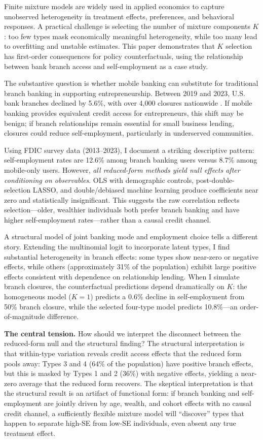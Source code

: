 \documentclass[12pt]{article}
\begin{document}
Finite mixture models are widely used in applied economics to capture unobserved heterogeneity in treatment effects, preferences, and behavioral responses. A practical challenge is selecting the number of mixture components $K$: too few types mask economically meaningful heterogeneity, while too many lead to overfitting and unstable estimates. This paper demonstrates that $K$ selection has first-order consequences for policy counterfactuals, using the relationship between bank branch access and self-employment as a case study.

The substantive question is whether mobile banking can substitute for traditional branch banking in supporting entrepreneurship. Between 2019 and 2023, U.S. bank branches declined by 5.6\%, with over 4,000 closures nationwide \citep{fdic2023}. If mobile banking provides equivalent credit access for entrepreneurs, this shift may be benign; if branch relationships remain essential for small business lending, closures could reduce self-employment, particularly in underserved communities.

Using FDIC survey data (2013--2023), I document a striking descriptive pattern: self-employment rates are 12.6\% among branch banking users versus 8.7\% among mobile-only users. However, \textit{all reduced-form methods yield null effects after conditioning on observables}. OLS with demographic controls, post-double-selection LASSO, and double/debiased machine learning produce coefficients near zero and statistically insignificant. This suggests the raw correlation reflects selection---older, wealthier individuals both prefer branch banking and have higher self-employment rates---rather than a causal credit channel.

A structural model of joint banking mode and employment choice tells a different story. Extending the multinomial logit to incorporate latent types, I find substantial heterogeneity in branch effects: some types show near-zero or negative effects, while others (approximately 31\% of the population) exhibit large positive effects consistent with dependence on relationship lending. When I simulate branch closures, the counterfactual predictions depend dramatically on $K$: the homogeneous model ($K=1$) predicts a 0.6\% decline in self-employment from 50\% branch closure, while the selected four-type model predicts 10.8\%---an order-of-magnitude difference.

\textbf{The central tension.} How should we interpret the disconnect between the reduced-form null and the structural finding? The structural interpretation is that within-type variation reveals credit access effects that the reduced form pools away: Types 3 and 4 (64\% of the population) have positive branch effects, but this is masked by Types 1 and 2 (36\%) with negative effects, yielding a near-zero average that the reduced form recovers. The skeptical interpretation is that the structural result is an artifact of functional form: if branch banking and self-employment are jointly driven by age, wealth, and cohort effects with no causal credit channel, a sufficiently flexible mixture model will ``discover'' types that happen to separate high-SE from low-SE individuals, even absent any true treatment effect.
\end{document}

